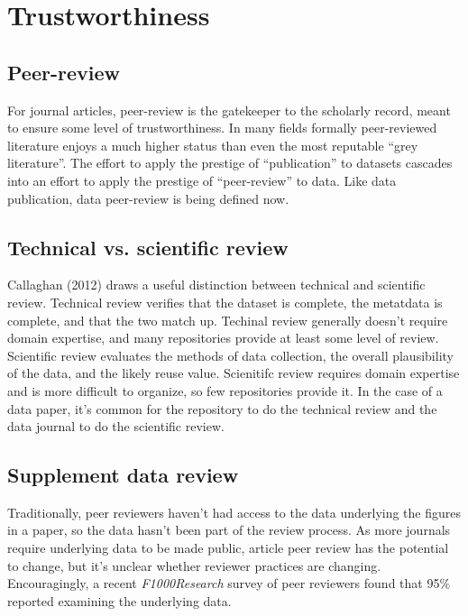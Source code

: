 \documentclass[10pt,a4paper,twocolumn]{article}
\begin{document}
\section*{Trustworthiness}\label{trustworthiness}

\subsection*{Peer-review}\label{peer-review}

For journal articles, peer-review is the gatekeeper to the scholarly record, meant to ensure some level of trustworthiness.
In many fields formally peer-reviewed literature enjoys a much higher status than even the most reputable ``grey literature''.
The effort to apply the prestige of ``publication'' to datasets cascades into an effort to apply the prestige of ``peer-review'' to data.
Like data publication, data peer-review is being defined now.

\subsection*{Technical vs. scientific review}
Callaghan (2012)\cite{callaghan_making_2012} draws a useful distinction between technical and scientific review. 
Technical review verifies that the dataset is complete, the metatdata is complete, and that the two match up.  
Techinal review generally doesn't require domain expertise, and many repositories provide at least some level of review. 
Scientific review evaluates the methods of data collection, the overall plausibility of the data, and the likely reuse value. 
Scienitifc review requires domain expertise and is more difficult to organize, so few repositories provide it.
In the case of a data paper, it's common for the repository to do the technical review and the data journal to do the scientific review.

\subsection*{Supplement data review}
Traditionally, peer reviewers haven't had access to the data underlying the figures in a paper, so the data hasn't been part of the review process.
As more journals require underlying data to be made public, article peer review has the potential to change, but it's unclear whether reviewer practices are changing.
Encouragingly, a recent \emph{F1000Research} survey of peer reviewers found that 95\% reported examining the underlying data.
\end{document}
